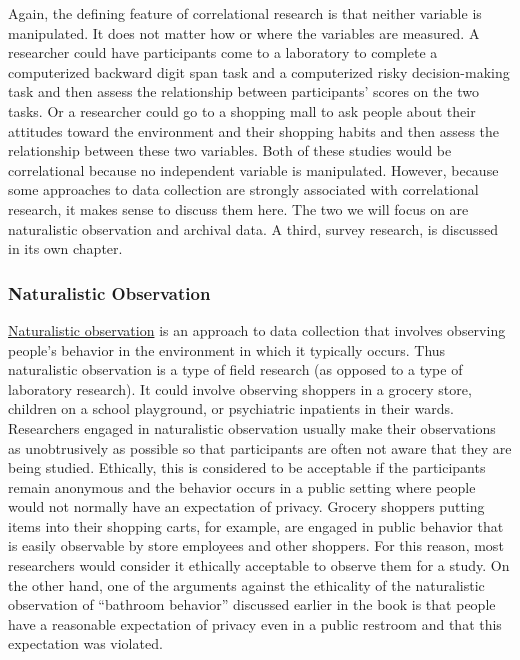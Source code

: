 \documentclass[
]{krantz}
\begin{document}
Again, the defining feature of correlational research is that neither variable is manipulated. It does not matter how or where the variables are measured. A researcher could have participants come to a laboratory to complete a computerized backward digit span task and a computerized risky decision-making task and then assess the relationship between participants' scores on the two tasks. Or a researcher could go to a shopping mall to ask people about their attitudes toward the environment and their shopping habits and then assess the relationship between these two variables. Both of these studies would be correlational because no independent variable is manipulated. However, because some approaches to data collection are strongly associated with correlational research, it makes sense to discuss them here. The two we will focus on are naturalistic observation and archival data. A third, survey research, is discussed in its own chapter.

\subsubsection*{Naturalistic Observation}\label{naturalistic-observation-1}


\hyperref[naturalistic-observation]{Naturalistic observation} is an approach to data collection that involves observing people's behavior in the environment in which it typically occurs. Thus naturalistic observation is a type of field research (as opposed to a type of laboratory research). It could involve observing shoppers in a grocery store, children on a school playground, or psychiatric inpatients in their wards. Researchers engaged in naturalistic observation usually make their observations as unobtrusively as possible so that participants are often not aware that they are being studied. Ethically, this is considered to be acceptable if the participants remain anonymous and the behavior occurs in a public setting where people would not normally have an expectation of privacy. Grocery shoppers putting items into their shopping carts, for example, are engaged in public behavior that is easily observable by store employees and other shoppers. For this reason, most researchers would consider it ethically acceptable to observe them for a study. On the other hand, one of the arguments against the ethicality of the naturalistic observation of ``bathroom behavior'' discussed earlier in the book is that people have a reasonable expectation of privacy even in a public restroom and that this expectation was violated.
\end{document}

